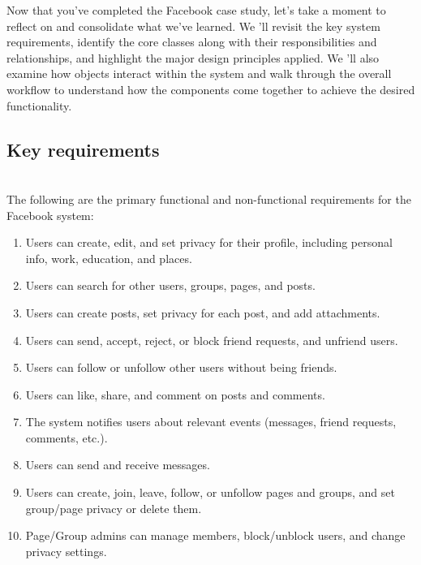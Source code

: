 

Now that you've completed the Facebook case study, let's take a moment to reflect on and consolidate what we've learned. We 'll revisit the key system requirements, identify the core classes along with their responsibilities and relationships, and highlight the major design principles applied. We
'll also examine how objects interact within the system and walk through the overall workflow to understand how the components come together to achieve the desired functionality.

\subsection{Key requirements}\label{FBaOp9Auez8xYVGpGTBel}
\\
The following are the primary functional and non-functional requirements for the Facebook system:

\begin{enumerate}
\item
\protect{}\label{fW4MbOiwJeiuW72yGzdte}
Users can create, edit, and set privacy for their profile, including personal info, work, education, and places.
\item
\protect{}\label{sdlJmwdRVTeHiaNJVPNT2}
Users can search for other users, groups, pages, and posts.
\item
\protect{}\label{xw84hH2bPOpNjGXjnj6bE}
Users can create posts, set privacy for each post, and add attachments.
\item
\protect{}\label{OyPHy-qnSCxykKtGjBrB2}
Users can send, accept, reject, or block friend requests, and unfriend users.
\item
\protect{}\label{696HKpXPdbAOJ4ZARJR81}
Users can follow or unfollow other users without being friends.
\item
\protect{}\label{e-E0V9uuBVzoGwZtYnShQ}
Users can like, share, and comment on posts and comments.
\item
\protect{}\label{VROeiBCbvNfYBMLIVT6QZ}
The system notifies users about relevant events (messages, friend requests, comments, etc.).
\item
\protect{}\label{ptlAGpDWVtGmvjjZIQCKD}
Users can send and receive messages.
\item
\protect{}\label{Kn8wBi3nPpomkkcmzzYRL}
Users can create, join, leave, follow, or unfollow pages and groups, and set group/page privacy or delete them.
\item
\protect{}\label{XqYTmUWQIPWnG5Q4MpAWH}
Page/Group admins can manage members, block/unblock users, and change privacy settings.
\end{enumerate}

